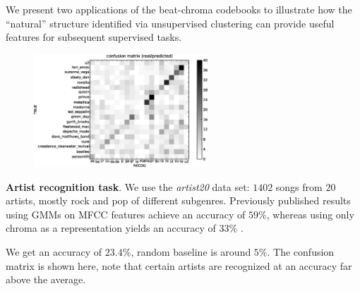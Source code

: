 \documentclass[portrait,a0b,final]{a0poster}
\newenvironment{poster}{
  \begin{center}
  \begin{minipage}[c]{0.98\textwidth}
}{
  \end{minipage} 
  \end{center}
}
\newcommand{\pbox}[4]{
\psshadowbox[#3]{
\begin{minipage}[t][#2][t]{#1}
#4
\end{minipage}
}}
\begin{document}
\begin{poster}
\begin{multicols}{3}
\vspace{2cm}
\begin{center}
  \pbox{0.8\columnwidth}{}{linewidth=2mm,framearc=0.1,linecolor=lightred,fillstyle=gradient,gradangle=0,gradbegin=white,gradend=whitepink,gradmidpoint=1.0,framesep=1em}{
    \begin{center}
      \large Experiments
    \end{center}}
\end{center}

\vspace{1.0cm}

\begin{minipage}[c]{\columnwidth}

We present two applications of the beat-chroma codebooks
to illustrate how the ``natural'' structure identified via 
unsupervised clustering can provide useful 
features for subsequent supervised tasks.
\vspace{1cm}

\begin{figure}
  \vspace{-20pt}
  \begin{center}
    \includegraphics[width=0.58\textwidth]{conf_mat_per_artist.ps}
  \end{center}
  \vspace{-20pt}
\end{figure}

\textbf{Artist recognition task}.
We use the {\it artist20} data set: $1402$ songs from $20$ artists, 
mostly rock and pop of different subgenres.  
Previously published results using GMMs on MFCC features achieve an 
accuracy of $59\%$, whereas using only chroma as a representation yields an
accuracy of $33\%$  \cite{Ellis2007}.

We get an accuracy of $\mathbf{23.4\%}$, random baseline 
is around $5\%$. 
The confusion matrix is shown here, note 
that certain artists are recognized at an accuracy far above the average.


\end{minipage}
\end{multicols}
\end{poster}
\end{document}
